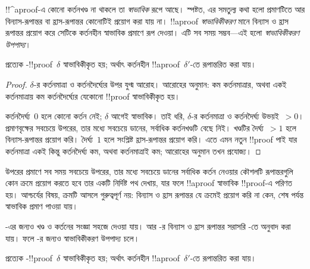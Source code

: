 \documentclass[../../../include/open-logic-section]{subfiles}
\begin{document}


!!^a{proof}-এ কোনো কর্তনখণ্ড না থাকলে
তা \emph{স্বাভাবিক} রূপে আছে। স্পষ্টত,
এর সমতুল্য কথা হলো প্রমাণটিতে আর
বিন্যাস-রূপান্তর বা হ্রাস-রূপান্তর
কোনোটিই প্রয়োগ করা যায় না।
!!a{proof} \emph{স্বাভাবিকীকরণ}
মানে বিন্যাস ও হ্রাস রূপান্তর
প্রয়োগ করে সেটিকে কর্তনহীন স্বাভাবিক
প্রমাণে রূপ দেওয়া। এটি সব সময়
সম্ভব—এই হলো \emph{স্বাভাবিকীকরণ
উপপাদ্য}।

\begin{thm}
প্রত্যেক -!!{proof}~$\delta$
স্বাভাবিকীকৃত হয়; অর্থাৎ কর্তনহীন
!!a{proof}~$\delta'$-তে রূপান্তরিত
করা যায়।
\end{thm}

\begin{proof}
  $\delta$-র কর্তনমাত্রা ও
  কর্তনদৈর্ঘ্যের উপর যুগ্ম আরোহ।
  আরোহের অনুমান: কম কর্তনমাত্রার,
  অথবা একই কর্তনমাত্রায় কম
  কর্তনদৈর্ঘ্যের যেকোনো !!{proof}
  স্বাভাবিকীকৃত হয়।

  কর্তনদৈর্ঘ্য~$0$ হলে কোনো কর্তন
  নেই; $\delta$ আগেই স্বাভাবিক।
  তাই ধরি, $\delta$-র কর্তনমাত্রা
  ও কর্তনদৈর্ঘ্য উভয়ই~$> 0$।
  প্রমাণবৃক্ষের সবচেয়ে উপরের,
  তার মধ্যে সবচেয়ে ডানের,
  সর্বাধিক কর্তনখণ্ডটি বেছে নিই।
  খণ্ডটির দৈর্ঘ্য~$>1$ হলে
  বিন্যাস-রূপান্তর প্রয়োগ করি।
  দৈর্ঘ্য~$1$ হলে সংশ্লিষ্ট
  হ্রাস-রূপান্তর প্রয়োগ করি।
  এতে এমন নতুন !!{proof} পাই
  যার কর্তনমাত্রা একই কিন্তু
  কর্তনদৈর্ঘ্য কম, অথবা
  কর্তনমাত্রাই কম; আরোহের
  অনুমান তখন প্রযোজ্য।
\end{proof}

উপরের প্রমাণে সব সময় সবচেয়ে
উপরের, তার মধ্যে সবচেয়ে ডানের
সর্বাধিক কর্তন
নেওয়ার কৌশলটি রূপান্তরগুলি কোন
ক্রমে প্রয়োগ করতে হবে তার একটি
নির্দিষ্ট পথ দেখায়, যার ফলে
!!a{proof} স্বাভাবিক !!{proof}-এ
পরিণত হয়। আশ্চর্যের বিষয়,
ক্রমটি আসলে গুরুত্বপূর্ণ নয়:
বিন্যাস ও হ্রাস রূপান্তর যে
ক্রমেই প্রয়োগ করি না কেন,
শেষ পর্যন্ত স্বাভাবিক প্রমাণ
পাওয়া যায়।

-এর জন্যও খণ্ড ও
কর্তনের সংজ্ঞা সহজে দেওয়া যায়।
আর -র বিন্যাস ও হ্রাস
রূপান্তর সরাসরি -তে
অনুবাদ করা যায়। ফলে
-র জন্যও
স্বাভাবিকীকরণ উপপাদ্য চলে।

\begin{thm}
প্রত্যেক -!!{proof}~$\delta$
স্বাভাবিকীকৃত হয়; অর্থাৎ কর্তনহীন
!!a{proof}~$\delta'$-তে রূপান্তরিত
করা যায়।
\end{thm}
\end{document}
